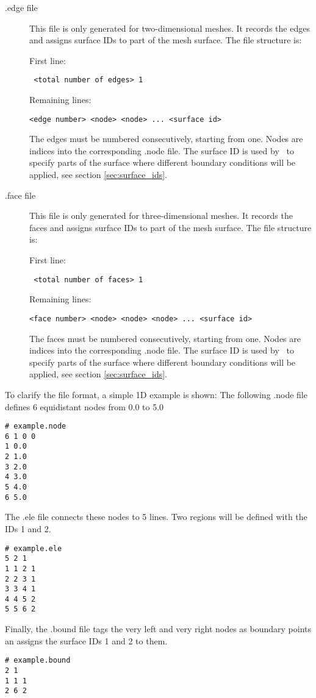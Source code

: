 \begin{description}
\item[.edge file] This file is only generated for two-dimensional meshes.
  It records the edges and assigns surface IDs to part of the mesh surface.
  The file structure is:

First line:
\begin{lstlisting}
 <total number of edges> 1
\end{lstlisting}
Remaining lines:
\begin{lstlisting}
<edge number> <node> <node> ... <surface id>
\end{lstlisting}
The edges must be numbered consecutively, starting from one. Nodes are
indices into the corresponding .node file. The surface ID is used by
\fluidity\ to specify parts of the surface where different boundary
conditions will be applied, see section \ref{sec:surface_ids}.


\item[.face file] This file is only generated for three-dimensional meshes.
  It records the faces and assigns surface IDs to part of the mesh surface. The
  file structure is:

First line:
\begin{lstlisting}
 <total number of faces> 1
\end{lstlisting}
Remaining lines:
\begin{lstlisting}
<face number> <node> <node> <node> ... <surface id>
\end{lstlisting}
The faces must be numbered consecutively, starting from one. Nodes are
indices into the corresponding .node file. The surface ID is used by
\fluidity\ to specify parts of the surface where different boundary
conditions will be applied, see section \ref{sec:surface_ids}.
\end{description}

To clarify the file format, a simple 1D example is shown:
The following .node file defines 6 equidistant nodes from 0.0 to 5.0
\begin{lstlisting}
# example.node
6 1 0 0
1 0.0
2 1.0
3 2.0
4 3.0
5 4.0
6 5.0
\end{lstlisting}
The .ele file connects these nodes to 5 lines. Two regions will be defined with the IDs 1 and 2.
\begin{lstlisting}
# example.ele
5 2 1
1 1 2 1
2 2 3 1
3 3 4 1
4 4 5 2
5 5 6 2
\end{lstlisting}
Finally, the .bound file tags the very left and very right nodes as boundary
points an assigns the surface IDs 1 and 2 to them.
\begin{lstlisting}
# example.bound
2 1
1 1 1
2 6 2
\end{lstlisting}

